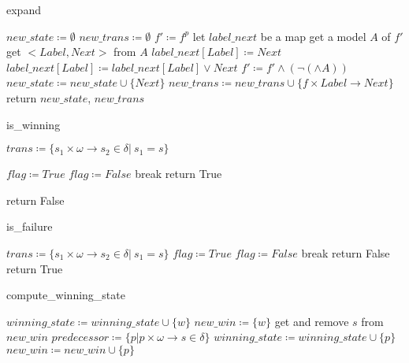 \begin{algorithm}[h]
\Large
\caption{expand}
\label{algo:expand}
$new\_state\coloneqq\emptyset$\;
$new\_trans\coloneqq\emptyset$\;
$f'\coloneqq f^p$\;
let $label\_next$ be a map\;
{
    get a model $A$ of $f'$\;
    get $<Label,Next>$ from $A$\;
    {
        $label\_next[Label]\coloneqq Next$\;
    }
    \Else
    {
        $label\_next[Label]\coloneqq label\_next[Label]\vee Next$\;
    }
    $f'\coloneqq f'\wedge(\neg(\wedge A))$\;
}
{
    $new\_state\coloneqq new\_state\cup\{Next\}$\;
    $new\_trans\coloneqq new\_trans\cup\{f\times Label\to Next\}$\;
}
return $new\_state$, $new\_trans$\;
\end{algorithm}

\begin{algorithm}[h]
\Large
\caption{is\_winning}
\label{algo:is_win}
$trans\coloneqq\{s_1\times\omega\to s_2\in\delta|\ s_1=s\}$\;
{
    $flag\coloneqq True$\;
    {
        {
            $flag\coloneqq False$\;
            break\;
        }
    }
    {
        return True\;
    }
    
}
return False\;
\end{algorithm}

\begin{algorithm}[h]
\Large
\caption{is\_failure}
\label{algo:is_fail}
$trans\coloneqq\{s_1\times\omega\to s_2\in\delta|\ s_1=s\}$\;
{
    $flag\coloneqq True$\;
    {
        {
            $flag\coloneqq False$\;
            break\;
        }
    }
    {
        return False\;
    }
}
return True\;
\end{algorithm}

\begin{algorithm}[h]
\Large
\caption{compute\_winning\_state}
\label{algo:comput_win}
$winning\_state\coloneqq winning\_state\cup\{w\}$\;
$new\_win\coloneqq \{w\}$\;
{
    get and remove $s$ from $new\_win$\;
    $predecessor\coloneqq\{p|p\times\omega\to s\in \delta\}$\;
    {
        {
            $winning\_state\coloneqq winning\_state\cup\{p\}$\;
            $new\_win\coloneqq new\_win\cup\{p\}$\;
        }
    }
}
\end{algorithm}

